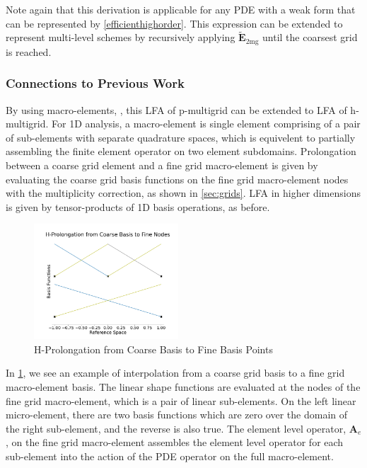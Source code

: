 \documentclass[review]{siamart190516}
\begin{document}
Note again that this derivation is applicable for any PDE with a weak form that can be represented by \cref{efficienthighorder}.
This expression can be extended to represent multi-level schemes by recursively applying $\tilde{\mathbf{E}}_{\text{2mg}}$ until the coarsest grid is reached.

\subsubsection{Connections to Previous Work}\label{sec:previouswork}

By using macro-elements, \cite{kumar2019local} \cite{brown2019local}, this LFA of p-multigrid can be extended to LFA of h-multigrid.
For 1D analysis, a macro-element is single element comprising of a pair of sub-elements with separate quadrature spaces, which is equivelent to partially assembling the finite element operator on two element subdomains.
Prolongation between a coarse grid element and a fine grid macro-element is given by evaluating the coarse grid basis functions on the fine grid macro-element nodes with the multiplicity correction, as shown in \cref{sec:grids}.
LFA in higher dimensions is given by tensor-products of 1D basis operations, as before.

\begin{figure}[!ht]
  \centering
  \includegraphics[width=0.48\textwidth]{img/hProlongation}
  \caption{H-Prolongation from Coarse Basis to Fine Basis Points}
  \label{fig:h_prolongation}
\end{figure}

In \cref{fig:h_prolongation}, we see an example of interpolation from a coarse grid basis to a fine grid macro-element basis.
The linear shape functions are evaluated at the nodes of the fine grid macro-element, which is a pair of linear sub-elements.
On the left linear micro-element, there are two basis functions which are zero over the domain of the right sub-element, and the reverse is also true.
The element level operator, $\mathbf{A}_e$, on the fine grid macro-element assembles the element level operator for each sub-element into the action of the PDE operator on the full macro-element.
\end{document}
